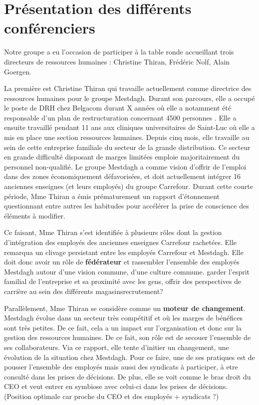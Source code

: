 \documentclass[a4paper, 12pt]{article}
\begin{document}


\section{Présentation des différents conférenciers}
Notre groupe a eu l'occasion de participer à la table ronde accueillant trois directeurs de ressources humaines : Christine Thiran, Frédéric Nolf, Alain Goergen.

La première est Christine Thiran qui travaille actuellement comme directrice des ressources humaines pour le groupe Mestdagh. Durant son parcours, elle a occupé le poste de DRH chez Belgacom  durant X années  où elle a notamment été responsable d'un plan de restructuration concernant 4500 personnes \cite{planBEST}.
Elle a ensuite travaillé pendant 11 ans aux cliniques universitaires de Saint-Luc où elle a mis en place une section ressources humaines.
Depuis cinq mois, elle travaille au sein de cette entreprise familiale du secteur de la grande distribution. Ce secteur en grande difficulté disposant de marges limitées emploie majoritairement du personnel non-qualifié. Le groupe Mestdagh a comme vision d'offrir de l'emploi dans des zones économiquement défavorisées, et doit actuellement intégrer 16 anciennes enseignes (et leurs employés) du groupe Carrefour.
Durant cette courte période, Mme Thiran a émis prématurement un rapport d'étonnement questionnant entre autres les habitudes pour accélérer la prise de conscience des éléments à modifier.

Ce faisant, Mme Thiran s'est identifiée à plusieurs rôles dont la gestion d'intégration des employés des anciennes enseignes Carrefour rachetées. Elle remarqua un clivage persistant entre les employés Carrefour et Mestdagh. Elle doit donc avoir un rôle de \textbf{fédérateur} et rassembler l'ensemble des employés Mestdagh autour d'une vision commune, d'une culture commune.  garder l'esprit familial de l'entreprise et sa proximité avec les gens, offrir des perspectives de carrière au sein des différents magasins\newline  recrutement?


Parallèlement, Mme Thiran se considère comme un \textbf{moteur de changement}. Mestdagh évolue dans un secteur très compétitif et où les marges de bénéfices sont très petites. De ce fait, cela a un impact sur l'organisation et donc sur la gestion des ressources humaines. De ce fait, son rôle est de secouer l'ensemble de ses collaborateurs. Via ce rapport, elle tente d'initier un changement, une évolution de la situation chez Mestdagh. \newline
Pour ce faire, une de ses pratiques est de pousser l'ensemble des employés mais aussi des syndicats à participer, à etre consulté dans les prises de décisions. De plus, elle se voit comme le bras droit du CEO et veut entrer en symbiose avec celui-ci dans les prises de décisions. (Position optimale car proche du CEO et des employés + syndicats  ?)
\end{document}

